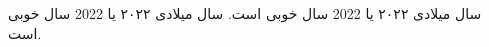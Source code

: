 \documentclass{article}
\begin{document}
سال میلادی ۲۰۲۲ یا 2022 سال خوبی است.
\TextDigitFontOff
سال میلادی ۲۰۲۲ یا 2022 سال خوبی است.
\end{document}
